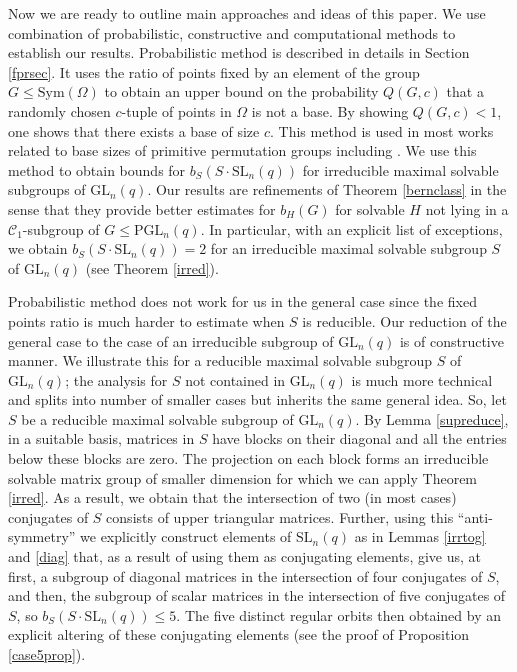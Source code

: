 \documentclass[a4paper,reqno,11pt]{amsart}
\theoremstyle{definition}
\theoremstyle{remark}
\numberwithin{equation}{section}
\newcommand{\Sym}{\mathrm{Sym}}
\newcommand{\SL}{{\mathrm{SL}}}
\newcommand{\GL}{{\mathrm{GL}}}
\newcommand{\PGL}{{\mathrm{PGL}}}
\begin{document}
  
 Now we are ready to outline main approaches and ideas of this paper.  We use combination of  probabilistic, constructive and computational methods to establish our results. Probabilistic method is described in details in Section \ref{fprsec}. It uses the ratio of points fixed by an element of the group $G \le \Sym(\Omega)$ to obtain an upper bound on the probability $Q(G,c)$ that a randomly chosen $c$-tuple of points in $\Omega$ is not a base. By showing $Q(G,c)<1$, one shows that there exists a base of size $c$. This method is used in most works related to base sizes of primitive permutation groups including  \cite{burness, sfa, bls, spor, lieb, mon}. We use this method to obtain bounds for $b_S(S \cdot \SL_n(q))$ for irreducible maximal solvable subgroups of $\GL_n(q).$  Our results  are refinements of Theorem \ref{bernclass} in the sense that they provide better estimates for $b_H(G)$  for solvable $H$ not lying in a $\mathcal{C}_1$-subgroup of $G \le \PGL_n(q)$.  In particular, with an explicit list of exceptions, we obtain $b_S(S \cdot \SL_n(q)) =2$ for an irreducible maximal solvable subgroup $S$ of $\GL_n(q)$  (see Theorem \ref{irred}).
 
  Probabilistic method does not work for us in the general case since the fixed points ratio is much harder to estimate when $S$ is reducible. Our reduction of the general case to the case of an irreducible subgroup of $\GL_n(q)$ is of constructive manner. We illustrate this for  a reducible maximal solvable subgroup $S$ of $\GL_n(q)$; the analysis for $S$ not contained in $\GL_n(q)$ is much more technical and splits into number of smaller cases but inherits the same general idea. So, let $S$ be a reducible maximal solvable subgroup of $\GL_n(q)$. By Lemma \ref{supreduce}, in a suitable basis, matrices in $S$ have blocks on their diagonal and all the entries below these blocks are zero. The projection on each block forms an irreducible solvable matrix group of smaller dimension for which we can apply Theorem \ref{irred}. As a result, we obtain that the intersection of two (in most cases) conjugates of $S$ consists of upper triangular matrices. Further, using this ``anti-symmetry'' we explicitly construct elements of $\SL_n(q)$ as in Lemmas \ref{irrtog}  and \ref{diag} that, as a result of using them as conjugating elements, give us, at first, a subgroup of diagonal matrices in the intersection of four conjugates of $S$, and then, the subgroup of scalar matrices in the intersection of five conjugates of $S$, so $b_S(S \cdot \SL_n(q))\le 5$.  The five distinct regular orbits then obtained by an explicit altering of these conjugating elements (see the proof of Proposition \ref{case5prop}).
  
\end{document}

